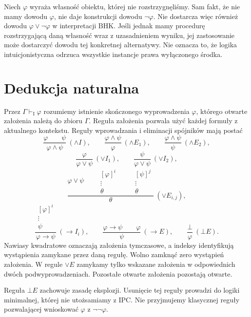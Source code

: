 \begin{przyklad}
\label{ex:ncl-bhk-disjunction}
Niech $\varphi$ wyraża własność obiektu, której
nie rozstrzygnęliśmy. Sam fakt, że nie mamy dowodu
$\varphi$, nie daje konstrukcji dowodu $\neg\varphi$.
Nie dostarcza więc również dowodu
$\varphi\vee\neg\varphi$ w interpretacji BHK.
Jeśli jednak mamy procedurę rozstrzygającą daną
własność wraz z uzasadnieniem wyniku, jej zastosowanie
może dostarczyć dowodu tej konkretnej alternatywy.
Nie oznacza to, że logika intuicjonistyczna odrzuca
wszystkie instancje prawa wyłączonego środka.
\end{przyklad}

\section{Dedukcja naturalna}

\begin{definicja}
\label{def:ncl-ipc-natural-deduction}
Przez $\Gamma\vdash_{\mathrm I}\varphi$ rozumiemy
istnienie skończonego wyprowadzenia $\varphi$,
którego otwarte założenia należą do zbioru $\Gamma$.
Reguła założenia pozwala użyć każdej formuły
z aktualnego kontekstu. Reguły wprowadzania
i eliminacji spójników mają postać
\[
 \frac{\varphi\qquad\psi}{\varphi\wedge\psi}
 \ (\wedge I),\qquad
 \frac{\varphi\wedge\psi}{\varphi}\ (\wedge E_1),
 \qquad
 \frac{\varphi\wedge\psi}{\psi}\ (\wedge E_2),
\]
\[
 \frac{\varphi}{\varphi\vee\psi}\ (\vee I_1),
 \qquad
 \frac{\psi}{\varphi\vee\psi}\ (\vee I_2),
\]
\[
 \frac{\varphi\vee\psi\qquad
       \begin{matrix}[\varphi]^i\\\vdots\\\theta\end{matrix}
       \qquad
       \begin{matrix}[\psi]^j\\\vdots\\\theta\end{matrix}}
      {\theta}\ (\vee E_{i,j}),
\]
\[
 \frac{\begin{matrix}[\varphi]^i\\\vdots\\\psi\end{matrix}}
      {\varphi\to\psi}\ (\to I_i),
 \qquad
 \frac{\varphi\to\psi\qquad\varphi}{\psi}\ (\to E),
 \qquad
 \frac{\bot}{\varphi}\ (\bot E).
\]
Nawiasy kwadratowe oznaczają założenia tymczasowe,
a indeksy identyfikują wystąpienia zamykane przez
daną regułę. Wolno zamknąć zero wystąpień założenia.
W regule $\vee E$ zamykamy tylko wskazane założenia
w odpowiednich dwóch podwyprowadzeniach.
Pozostałe otwarte założenia pozostają otwarte.
\end{definicja}
Reguła $\bot E$ zachowuje zasadę eksplozji.
Usunięcie tej reguły prowadzi do logiki minimalnej,
której nie utożsamiamy z IPC.
Nie przyjmujemy klasycznej reguły pozwalającej
wnioskować $\varphi$ z $\neg\neg\varphi$.

